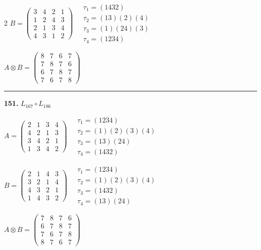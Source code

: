 \begin{multicols}{2}
$B = \begin{pmatrix} 3 & 4 & 2 & 1 \\ 1 & 2 & 4 & 3 \\ 2 & 1 & 3 & 4 \\ 4 & 3 & 1 & 2 \end{pmatrix} \quad \begin{matrix} \tau_{1}=(1 4 3 2) \\ \tau_{2}=(1 3)(2)(4) \\ \tau_{3}=(1)(2 4)(3) \\ \tau_{4}=(1 2 3 4) \end{matrix}$

$A \otimes B = \begin{pmatrix} 8 & 7 & 6 & 7 \\ 7 & 8 & 7 & 6 \\ 6 & 7 & 8 & 7 \\ 7 & 6 & 7 & 8 \end{pmatrix}$

\vspace{0.3em}
\hrule
\vspace{0.3em}

\noindent\textbf{151.} $L_{167} \circ L_{186}$

$A = \begin{pmatrix} 2 & 1 & 3 & 4 \\ 4 & 2 & 1 & 3 \\ 3 & 4 & 2 & 1 \\ 1 & 3 & 4 & 2 \end{pmatrix} \quad \begin{matrix} \tau_{1}=(1 2 3 4) \\ \tau_{2}=(1)(2)(3)(4) \\ \tau_{3}=(1 3)(2 4) \\ \tau_{4}=(1 4 3 2) \end{matrix}$

$B = \begin{pmatrix} 2 & 1 & 4 & 3 \\ 3 & 2 & 1 & 4 \\ 4 & 3 & 2 & 1 \\ 1 & 4 & 3 & 2 \end{pmatrix} \quad \begin{matrix} \tau_{1}=(1 2 3 4) \\ \tau_{2}=(1)(2)(3)(4) \\ \tau_{3}=(1 4 3 2) \\ \tau_{4}=(1 3)(2 4) \end{matrix}$

$A \otimes B = \begin{pmatrix} 7 & 8 & 7 & 6 \\ 6 & 7 & 8 & 7 \\ 7 & 6 & 7 & 8 \\ 8 & 7 & 6 & 7 \end{pmatrix}$


\end{multicols}
